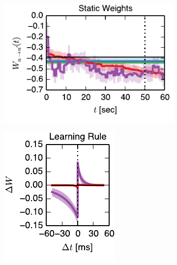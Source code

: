 \begin{figure}[t!]
  \centering
  \vspace{-0.5em}
  \begin{subfigure}[T]{2.4in}
    \includegraphics[width=\textwidth]{figures/ch6/fig3_static_trajectory}    
    \label{fig:fig3_static_trajectory}
  \end{subfigure}
  \begin{subfigure}[T]{1.45in}
    \includegraphics[width=\textwidth]{figures/ch6/fig3_static_stdp_rule}    

\end{subfigure}
\end{figure}
